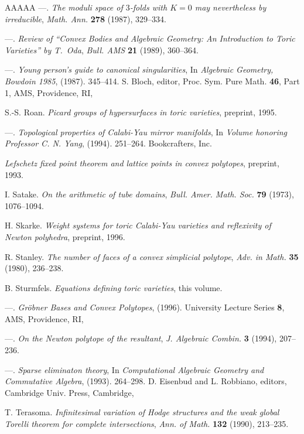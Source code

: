 \documentclass{amsart}
\theoremstyle{plain}
\theoremstyle{definition}
\begin{document}
\begin{thebibliography}{AAAAA}
---. \textit{The moduli space of $3$-folds with $K = 0$ may nevertheless by irreducible}, \textit{Math. Ann.} \textbf{278} (1987), 329--334.

---. \textit{Review of ``Convex Bodies and Algebraic Geometry: An Introduction to Toric Varieties'' by T.\ Oda}, \textit{Bull. AMS} \textbf{21} (1989), 360--364.

---. \textit{Young person's guide to canonical singularities}, In \textit{Algebraic Geometry, Bowdoin 1985}, (1987). 345--414. S. Bloch, editor, Proc. Sym. Pure Math. \textbf{46}, Part 1, AMS, Providence, RI,

S.-S. Roan. \textit{Picard groups of hypersurfaces in toric varieties}, preprint, 1995.

---. \textit{Topological properties of Calabi-Yau mirror manifolds}, In \textit{Volume honoring Professor C. N. Yang}, (1994). 251--264. Bookcrafters, Inc.

\textit{Lefschetz fixed point theorem and lattice points in convex polytopes}, preprint, 1993.

I. Satake. \textit{On the arithmetic of tube domains}, \textit{Bull. Amer. Math. Soc.} \textbf{79} (1973), 1076--1094.

H. Skarke. \textit{Weight systems for toric Calabi-Yau varieties and reflexivity of Newton polyhedra}, preprint, 1996.

R. Stanley. \textit{The number of faces of a convex simplicial polytope}, \textit{Adv. in Math.} \textbf{35} (1980), 236--238.

B. Sturmfels. \textit{Equations defining toric varieties}, this volume.

---. \textit{Gr\"obner Bases and Convex Polytopes}, (1996). University Lecture Series \textbf{8}, AMS, Providence, RI,

---. \textit{On the Newton polytope of the resultant}, \textit{J. Algebraic Combin.} \textbf{3} (1994), 207--236.

---. \textit{Sparse eliminaton theory}, In \textit{Computational Algebraic Geometry and Commutative Algebra}, (1993). 264--298. D. Eisenbud and L. Robbiano, editors, Cambridge Univ. Press, Cambridge,

T. Terasoma. \textit{Infinitesimal variation of Hodge structures and the weak global Torelli theorem for complete intersections}, \textit{Ann. of Math.} \textbf{132} (1990), 213--235.


\end{thebibliography}
\end{document}
